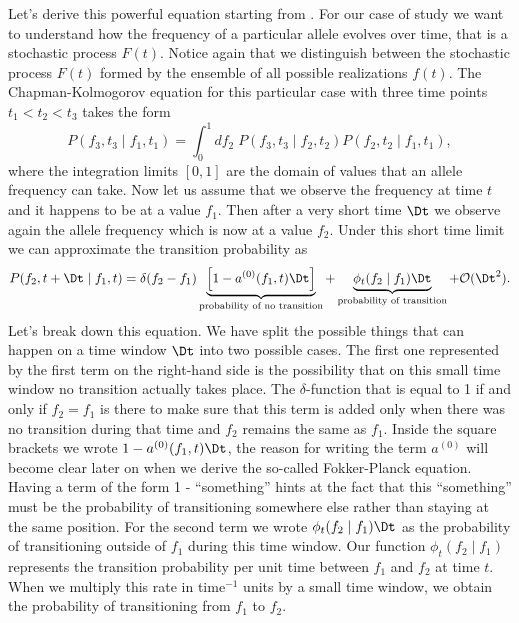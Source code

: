 Let's derive this powerful equation starting from .
For our case of study we want to understand how the frequency of a particular
allele evolves over time, that is a stochastic process $F(t)$. Notice again that
we distinguish between the stochastic process $F(t)$ formed by the ensemble of
all possible realizations $f(t)$. The Chapman-Kolmogorov equation for this
particular case with three time points $t_1 < t_2 < t_3$ takes the form
\begin{equation}
  P(f_3, t_3 \mid f_1, t_1) = \int_0^1 df_2\; P(f_3, t_3 \mid f_2, t_2)
                                          P(f_2, t_2 \mid f_1, t_1),
  \label{eq_chapman_freq}
\end{equation}
where the integration limits $[0, 1]$ are the domain of values that an allele
frequency can take. Now let us assume that we observe the frequency at time $t$
and it happens to be at a value $f_1$. Then after a very short time $\Dt$ we
observe again the allele frequency which is now at a value $f_2$. Under this
short time limit we can approximate the transition probability as
\begin{equation}
  P(f_2, t + \Dt \mid f_1, t) = \delta(f_2 - f_1)
  \underbrace{\left[ 1 - a^{(0)}(f_1, t) \Dt \right]}_{\text{probability
  of no transition}} +
  \underbrace{\phi_t(f_2 \mid f_1)\Dt}_\text{probability of transition} +
  \mathcal{O}(\Dt^2).
  \label{eq_transition_short_time}
\end{equation}
Let's break down this equation. We have split the possible things that can
happen on a time window $\Dt$ into two possible cases. The first one represented
by the first term on the right-hand side is the possibility that on this small
time window no transition actually takes place. The $\delta$-function that is
equal to 1 if and only if $f_2 = f_1$ is there to make sure that this term is
added only when there was no transition during that time and $f_2$ remains the
same as $f_1$. Inside the square brackets we wrote $1 - a^{(0)}(f_1, t) \Dt$,
the reason for writing the term $a^{(0)}$ will become clear later on when we
derive the so-called Fokker-Planck equation. Having a term of the form 1 -
``something'' hints at the fact that this ``something'' must be the probability
of transitioning somewhere else rather than staying at the same position. For
the second term we wrote $\phi_t(f_2 \mid f_1)\Dt$ as the probability of
transitioning outside of $f_1$ during this time window. Our function $\phi_t(f_2
\mid f_1)$ represents the transition probability per unit time between $f_1$ and
$f_2$ at time $t$. When we multiply this rate in time$^{-1}$ units by a small
time window, we obtain the probability of transitioning from $f_1$ to $f_2$.

